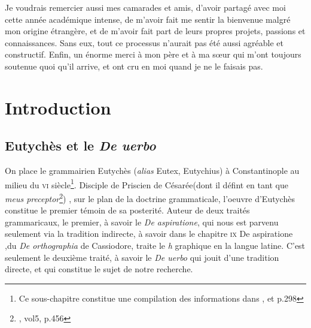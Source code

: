 \documentclass[a4paper, twoside, 12pt]{book}
\begin{document}
Je voudrais remercier aussi mes camarades et amis, d’avoir partagé avec moi cette année académique intense, de m'avoir fait me sentir la bienvenue malgré mon origine étrangère, et de m'avoir fait part de leurs propres projets, passions et connaissances. Sans eux, tout ce processus n'aurait pas été aussi agréable et constructif. Enfin, un énorme merci à mon père et à ma sœur qui m'ont toujours soutenue quoi qu'il arrive, et ont cru en moi quand je ne le faisais pas.

\tableofcontents

\clearpage

\mainmatter







\chapter{Introduction}
\section{Eutychès  et le \textit{De uerbo}}

On place le grammairien Eutychès (\textit{alias} Eutex, Eutychius) à Constantinople au milieu du \textsc{vi}\ieme{} siècle\footnote{ Ce sous-chapitre constitue une compilation des informations dans \cite{lomanto1985Eutiche}, \cite{conduche2019miseenpage} et \cite{zetzel2018critics}p.298}. Disciple de Priscien de Césarée(dont il défint en tant que \textit{meus preceptor}\footnote{\cite{keil1857grammatici}, vol5, p.456}) , sur le plan de la doctrine grammaticale,  l'oeuvre d'Eutychès constitue le premier témoin de sa posterité. Auteur de deux traités grammaricaux, le premier, à savoir le \textit{De aspiratione}, qui nous est parvenu seulement via la tradition indirecte, à savoir dans le chapitre  \textsc{ix} \og{} De aspiratione \fg{},du \textit{De orthographia} de Cassiodore, traite le \textit{h} graphique en la langue latine. C'est seulement le deuxième traité, à savoir le \textit{De uerbo} qui jouit d'une tradition directe, et qui constitue le sujet de notre recherche.
\end{document}
